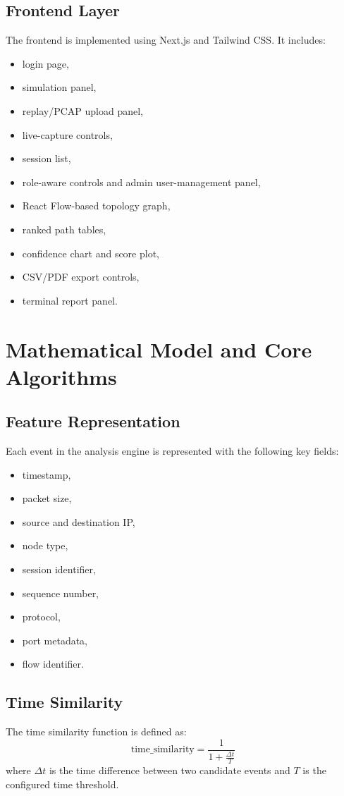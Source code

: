 \documentclass[12pt,a4paper]{report}
\begin{document}
\section{Frontend Layer}
The frontend is implemented using Next.js and Tailwind CSS. It includes:
\begin{itemize}[leftmargin=1.5em]
    \item login page,
    \item simulation panel,
    \item replay/PCAP upload panel,
    \item live-capture controls,
    \item session list,
    \item role-aware controls and admin user-management panel,
    \item React Flow-based topology graph,
    \item ranked path tables,
    \item confidence chart and score plot,
    \item CSV/PDF export controls,
    \item terminal report panel.
\end{itemize}

\chapter{Mathematical Model and Core Algorithms}
\section{Feature Representation}
Each event in the analysis engine is represented with the following key fields:
\begin{itemize}[leftmargin=1.5em]
    \item timestamp,
    \item packet size,
    \item source and destination IP,
    \item node type,
    \item session identifier,
    \item sequence number,
    \item protocol,
    \item port metadata,
    \item flow identifier.
\end{itemize}

\section{Time Similarity}
The time similarity function is defined as:
\[
\text{time\_similarity} = \frac{1}{1 + \frac{\Delta t}{T}}
\]
where $\Delta t$ is the time difference between two candidate events and $T$ is the configured time threshold.
\end{document}
